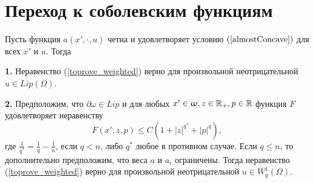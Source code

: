 \section{Переход к соболевским функциям}

\begin{thm}
\label{bounded_growth_thm}
Пусть функция $a(x', \cdot, u)$ четна и удовлетворяет условию $(\ref{almostConcave})$ для всех $x'$ и $u$.
Тогда

\textbf{1.} Неравенство (\ref{toprove_weighted}) верно для произвольной неотрицательной $u \in Lip(\Omega)$.

\textbf{2.} Предположим, что $\partial \omega \in Lip$ и
для любых $x' \in \upomega, z \in \mathbb R_+, p \in \mathbb R$
функция $F$ удовлетворяет неравенству
$$F( x', z, p ) \le C ( 1 + |z|^{q^*} + |p|^q ),$$
где $\frac{1}{q^*} = \frac{1}{q} - \frac{1}{n}$, если $q < n$, либо $q^*$ любое в противном случае.
Если $q \le n$, то дополнительно предположим, что веса $a$ и $a_i$ ограничены.
Тогда неравенство (\ref{toprove_weighted}) верно для произвольной неотрицательной $u \in W^1_q(\Omega)$.
\end{thm}
